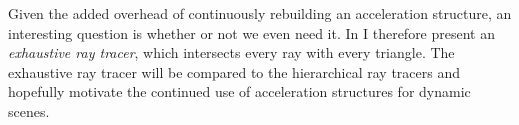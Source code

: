 Given the added overhead of continuously rebuilding an acceleration
structure, an interesting question is whether or not we even need
it. In  I therefore present an
\textit{exhaustive ray tracer}, which intersects every ray with every
triangle. The exhaustive ray tracer will be compared to the
hierarchical ray tracers and hopefully motivate the continued use of
acceleration structures for dynamic scenes.






